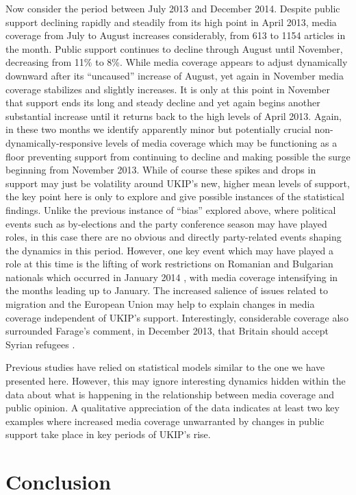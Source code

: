 \documentclass[12pt,]{article}
\begin{document}
Now consider the period between July 2013 and December 2014. Despite
public support declining rapidly and steadily from its high point in
April 2013, media coverage from July to August increases considerably,
from 613 to 1154 articles in the month. Public support continues to
decline through August until November, decreasing from 11\% to 8\%.
While media coverage appears to adjust dynamically downward after its
``uncaused'' increase of August, yet again in November media coverage
stabilizes and slightly increases. It is only at this point in November
that support ends its long and steady decline and yet again begins
another substantial increase until it returns back to the high levels of
April 2013. Again, in these two months we identify apparently minor but
potentially crucial non-dynamically-responsive levels of media coverage
which may be functioning as a floor preventing support from continuing
to decline and making possible the surge beginning from November 2013.
While of course these spikes and drops in support may just be volatility
around UKIP's new, higher mean levels of support, the key point here is
only to explore and give possible instances of the statistical findings.
Unlike the previous instance of ``bias'' explored above, where political
events such as by-elections and the party conference season may have
played roles, in this case there are no obvious and directly
party-related events shaping the dynamics in this period. However, one
key event which may have played a role at this time is the lifting of
work restrictions on Romanian and Bulgarian nationals which occurred in
January 2014 \citep{martin_immigration_2013}, with media coverage
intensifying in the months leading up to January. The increased salience
of issues related to migration and the European Union may help to
explain changes in media coverage independent of UKIP's support.
Interestingly, considerable coverage also surrounded Farage's comment,
in December 2013, that Britain should accept Syrian refugees
\citep{goodman_does_2013}.

Previous studies have relied on statistical models similar to the one we
have presented here. However, this may ignore interesting dynamics
hidden within the data about what is happening in the relationship
between media coverage and public opinion. A qualitative appreciation of
the data indicates at least two key examples where increased media
coverage unwarranted by changes in public support take place in key
periods of UKIP's rise.

\section{Conclusion}\label{conclusion}
\end{document}
